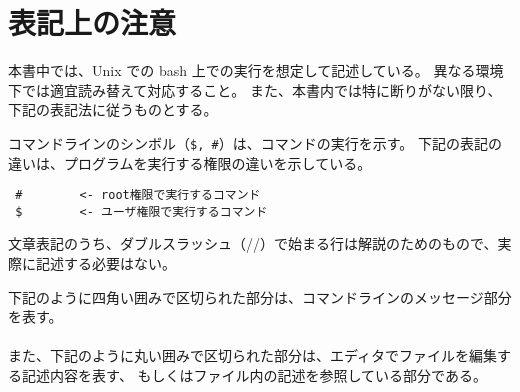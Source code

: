\section{表記上の注意} \label{sec:notation}

本書中では、Unix での bash 上での実行を想定して記述している。
異なる環境下では適宜読み替えて対応すること。
また、本書内では特に断りがない限り、下記の表記法に従うものとする。


コマンドラインのシンボル（\verb|$, #|）は、コマンドの実行を示す。
下記の表記の違いは、プログラムを実行する権限の違いを示している。

\begin{verbatim}
 #        <- root権限で実行するコマンド
 $        <- ユーザ権限で実行するコマンド
\end{verbatim}

文章表記のうち、ダブルスラッシュ（//）で始まる行は解説のためのもので、実際に記述する必要はない。

下記のように四角い囲みで区切られた部分は、コマンドラインのメッセージ部分を表す。\\

\\

また、下記のように丸い囲みで区切られた部分は、エディタでファイルを編集する記述内容を表す、
もしくはファイル内の記述を参照している部分である。\\

